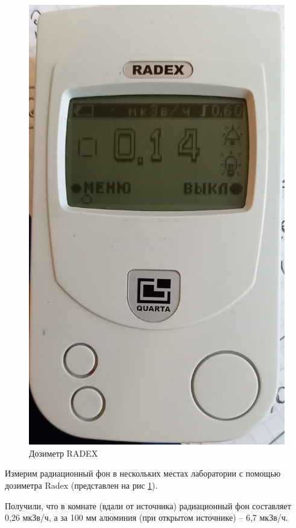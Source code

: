 \documentclass[a4paper,12pt]{article}
\begin{document}
\begin{figure}[h]
	\centering
	\includegraphics[scale=0.2]{fig3} 
	\caption{Дозиметр RADEX}
	\label{Radex}
\end{figure}

Измерим 	радиационный фон в нескольких местах лаборатории с помощью дозиметра Radex (представлен на рис \ref{Radex}).

Получили, что в комнате (вдали от источника) радиационный фон составляет 0,26 мкЗв/ч, а за 100 мм алюминия (при открытом источнике) -- 6,7 мкЗв/ч. 
\end{document}
